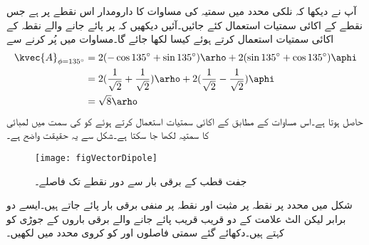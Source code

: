 آپ نے دیکھا کہ نلکی محدد میں سمتیہ کی مساوات کا دارومدار اس نقطے پر ہے جس نقطے کے اکائی سمتیات استعمال کئے جائیں۔آئیں دیکھیں کہ  پر پائے جانے والے  نقطہ  کے اکائی سمتیات استعمال کرتے ہوئے  کیسا لکھا جائے گا۔مساوات  میں  پُر کرنے سے
\begin{align*}
\kvec{A}_{\phi=135^\circ}&=2(- \cos 135^\circ + \sin 135^\circ) \arho +2( \sin 135^\circ + \cos 135^\circ)\aphi\\
&=2(\frac{1}{\sqrt{2}}+\frac{1}{\sqrt{2}})\arho+2(\frac{1}{\sqrt{2}}-\frac{1}{\sqrt{2}})\aphi\\
&=\sqrt{8}\arho
\end{align*}
حاصل ہوتا ہے۔اس مساوات کے مطابق  کے اکائی سمتیات استعمال کرتے ہوئے  کو  کی سمت میں  لمبائی کا سمتیہ لکھا جا سکتا ہے۔شکل سے یہ حقیقت واضح ہے۔ 

\begin{figure}
\centering
\texttt{[image: figVectorDipole]}
\caption{جفت قطب کے برقی بار سے دور نقطے تک فاصلے۔}
\label{شکل_سمتیہ_جفت_قطب}
\end{figure}
شکل  میں  محدد پر نقطہ  پر مثبت   اور نقطہ  پر منفی برقی بار   پائے جاتے ہیں۔ایسے دو برابر لیکن الٹ علامت کے دو قریب قریب پائے جانے والے برقی باروں کے جوڑی کو  کہتے ہیں۔دکھائے گئے سمتی فاصلوں  اور  کو کروی محدد میں لکھیں۔ 

